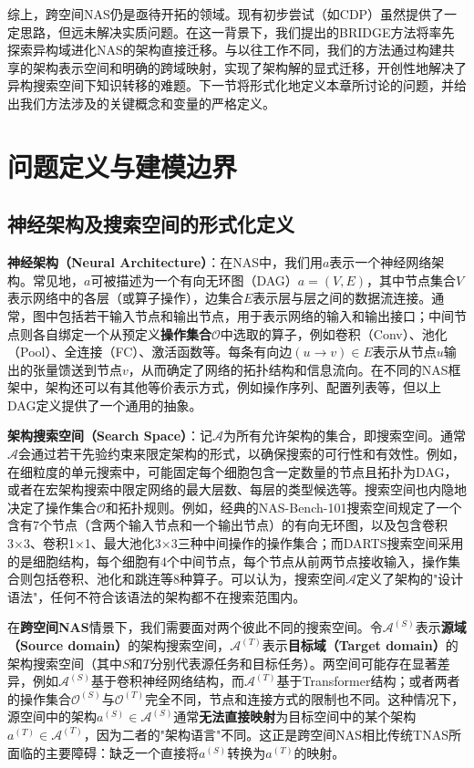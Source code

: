 \documentclass[../main.tex]{subfiles}
\begin{document}
综上，跨空间NAS仍是亟待开拓的领域。现有初步尝试（如CDP）虽然提供了一定思路，但远未解决实质问题。在这一背景下，我们提出的BRIDGE方法将率先探索异构域进化NAS的架构直接迁移。与以往工作不同，我们的方法通过构建共享的架构表示空间和明确的跨域映射，实现了架构解的显式迁移，开创性地解决了异构搜索空间下知识转移的难题。下一节将形式化地定义本章所讨论的问题，并给出我们方法涉及的关键概念和变量的严格定义。

\section{问题定义与建模边界}
\label{sec:chapter4_problem_formulation}

\subsection{神经架构及搜索空间的形式化定义}

\textbf{神经架构（Neural Architecture）}：在NAS中，我们用$a$表示一个神经网络架构。常见地，$a$可被描述为一个有向无环图（DAG）$a=(V, E)$，其中节点集合$V$表示网络中的各层（或算子操作），边集合$E$表示层与层之间的数据流连接。通常，图中包括若干输入节点和输出节点，用于表示网络的输入和输出接口；中间节点则各自绑定一个从预定义\textbf{操作集合}$\mathcal{O}$中选取的算子，例如卷积（Conv）、池化（Pool）、全连接（FC）、激活函数等。每条有向边$(u \rightarrow v) \in E$表示从节点$u$输出的张量馈送到节点$v$，从而确定了网络的拓扑结构和信息流向。在不同的NAS框架中，架构还可以有其他等价表示方式，例如操作序列、配置列表等，但以上DAG定义提供了一个通用的抽象。

\textbf{架构搜索空间（Search Space）}：记$\mathcal{A}$为所有允许架构的集合，即搜索空间。通常$\mathcal{A}$会通过若干先验约束来限定架构的形式，以确保搜索的可行性和有效性。例如，在细粒度的单元搜索中，可能固定每个细胞包含一定数量的节点且拓扑为DAG，或者在宏架构搜索中限定网络的最大层数、每层的类型候选等。搜索空间也内隐地决定了操作集合$\mathcal{O}$和拓扑规则。例如，经典的NAS-Bench-101搜索空间规定了一个含有7个节点（含两个输入节点和一个输出节点）的有向无环图，以及包含卷积3×3、卷积1×1、最大池化3×3三种中间操作的操作集合；而DARTS搜索空间采用的是细胞结构，每个细胞有4个中间节点，每个节点从前两节点接收输入，操作集合则包括卷积、池化和跳连等8种算子。可以认为，搜索空间$\mathcal{A}$定义了架构的"设计语法"，任何不符合该语法的架构都不在搜索范围内。

在\textbf{跨空间NAS}情景下，我们需要面对两个彼此不同的搜索空间。令$\mathcal{A}^{(S)}$表示\textbf{源域（Source domain）}的架构搜索空间，$\mathcal{A}^{(T)}$表示\textbf{目标域（Target domain）}的架构搜索空间（其中$S$和$T$分别代表源任务和目标任务）。两空间可能存在显著差异，例如$\mathcal{A}^{(S)}$基于卷积神经网络结构，而$\mathcal{A}^{(T)}$基于Transformer结构；或者两者的操作集合$\mathcal{O}^{(S)}$与$\mathcal{O}^{(T)}$完全不同，节点和连接方式的限制也不同。这种情况下，源空间中的架构$a^{(S)} \in \mathcal{A}^{(S)}$通常\textbf{无法直接映射}为目标空间中的某个架构$a^{(T)} \in \mathcal{A}^{(T)}$，因为二者的"架构语言"不同。这正是跨空间NAS相比传统TNAS所面临的主要障碍：缺乏一个直接将$a^{(S)}$转换为$a^{(T)}$的映射。
\end{document}

